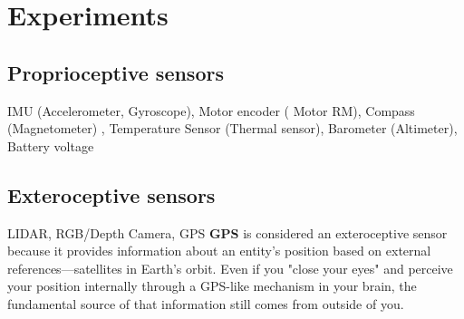 \chapter{Experiments}
    \section{Proprioceptive sensors} IMU (Accelerometer, Gyroscope), Motor encoder (	Motor RM), Compass (Magnetometer) , Temperature Sensor (Thermal sensor), Barometer (Altimeter), Battery voltage
    
    \section{Exteroceptive sensors} LIDAR, RGB/Depth Camera, GPS 
        \textbf{GPS} is considered an exteroceptive sensor because it provides information about an entity’s position based on external references—satellites in Earth's orbit. Even if you "close your eyes" and perceive your position internally through a GPS-like mechanism in your brain, the fundamental source of that information still comes from outside of you.